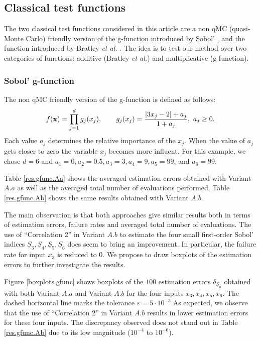 \subsection{Classical test functions}
\label{sec:5.1}

The two classical test functions considered in this article are {\color{purple} a non qMC (quasi-Monte Carlo) friendly version of the} g-function introduced by Sobol' \cite{Sobol'}, and the function introduced by Bratley \textit{et al.} \cite{Bratley}. The idea is to test our method over two categories of functions: additive (Bratley \textit{et al.}) and multiplicative (g-function).

\subsubsection{Sobol' g-function}

{\color{purple} 
The non qMC friendly version of the g-function is defined as follows:
\begin{equation*}
f(\boldsymbol{\mathbf{x}})= \prod \limits_{j=1}^{d}g_j(x_j), \qquad g_j(x_j)=\frac{\left |3x_j-2 \right | + a_j}{1 + a_j}, \ a_j \geq 0.
\end{equation*}}
Each value $a_j$ determines the relative importance of the $x_j$. When the value of $a_j$ gets closer to zero the variable $x_j$ becomes more influent. For this example, we chose $d=6$ and $a_1=0,a_2=0.5, a_3=3, a_4=9, a_5=99$, and $a_6=99$.

Table \ref{res.gfunc.Aa} shows the averaged estimation errors obtained with Variant $A.a$ as well as the averaged total number of evaluations performed. Table \ref{res.gfunc.Ab} shows the same results obtained with Variant $A.b$.

The main observation is that both approaches give similar results both in terms of estimation errors, failure rates and averaged total number of evaluations. The use of ``Correlation 2'' in Variant $A.b$ to estimate the four small first-order Sobol' indices $\underline{S}_3, \underline{S}_4, \underline{S}_5, \underline{S}_6$ {\color{purple}  does seem to bring an improvement. In particular, the failure rate for input $x_3$ is reduced to $0$.} We propose to draw boxplots of the estimation errors to further investigate the results. 
\bigskip

Figure \ref{boxplots.gfunc} shows boxplots of the $100$ estimation errors $\delta_{\underline{S}_u}$ obtained with both Variant $A.a$ and Variant $A.b$ for the four inputs $x_3,x_4,x_5,x_6$. The dashed horizontal line marks the tolerance $\varepsilon=5\cdot 10^{-3}$.As expected, we observe that the use of ``Correlation 2'' in Variant $A.b$ results in lower estimation errors for these four inputs. The discrepancy observed does not stand out in Table \ref{res.gfunc.Ab} due to its low magnitude ($10^{-4}$ to $10^{-6}$).

